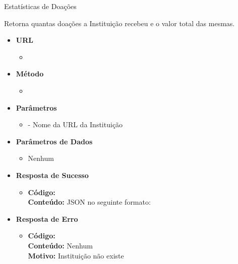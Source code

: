 
\begin{caixa}{Estatísticas de Doações}{}

Retorna quantas doações a Instituição recebeu e o valor total das mesmas.

\begin{itemize}
\item \textbf{URL}
	\begin{itemize}
		\item {}
	\end{itemize}

\item \textbf{Método}
	\begin{itemize}
		\item {}
	\end{itemize}

\item \textbf{Parâmetros}
	\begin{itemize}
		\item {} - Nome da URL da Instituição
	\end{itemize}

\item \textbf{Parâmetros de Dados}
	\begin{itemize}
		\item Nenhum
	\end{itemize}

\item \textbf{Resposta de Sucesso}
	\begin{itemize}
		\item \textbf{Código:}  \\ \textbf{Conteúdo:} JSON no seguinte formato: \\ 
	\end{itemize}

\item \textbf{Resposta de Erro}
	\begin{itemize}
		\item \textbf{Código:}  \\ \textbf{Conteúdo:} Nenhum \\ \textbf{Motivo:} Instituição não existe
	\end{itemize}

\end{itemize}
\end{caixa}

